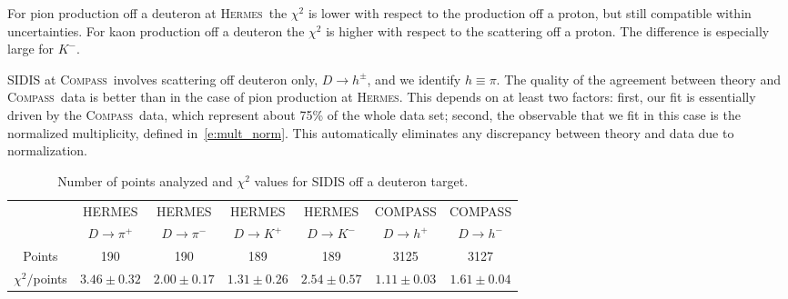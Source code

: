 \documentclass[aps,preprintnumbers,showpacs,nofootinbib,superscriptaddress,floatfix]{revtex4}
\newcommand{\hermes}{\textsc{Hermes}}
\newcommand{\compass}{\textsc{Compass}}
\begin{document}
For pion production off a deuteron at \hermes\ the $\chi^2$ is lower with
respect to the production off a proton, but still compatible within
uncertainties. For kaon production off a deuteron the $\chi^2$ is higher with
respect to the scattering off a proton. The difference is especially large for $K^-$. 

SIDIS at \compass\ involves scattering off deuteron only, $D \to h^\pm$, and we identify $h \equiv \pi$. 
The quality of the agreement between theory and \compass\ data is better than
in the case of pion production at \hermes. This depends on at least two
factors: first, our fit is essentially driven by the \compass\ data, which
represent about 75\% of the whole data set; second, the
observable that we fit in this case is the normalized
multiplicity, defined in~\eqref{e:mult_norm}. This automatically eliminates
any discrepancy between theory and data due to normalization. 
\begin{table}[h!]
\begin{center}
\begin{tabular}{|c|c|c|c|c|c|c|}
 \hline
\hline
  & HERMES & HERMES & HERMES & HERMES & COMPASS & COMPASS\\
 ~          &  $D \to \pi^+$    &   $D \to \pi^-$    &  $D \to K^+$    &   $D \to K^-$      &  $D \to h^+$    &   $D \to h^-$            \\
\hline
 Points         &  190 & 190 & 189 & 189   & 3125 & 3127   \\
 \hline
$\chi^2 /$points & $3.46\pm 0.32$ & $2.00\pm 0.17$ & $1.31\pm 0.26$ & $2.54\pm 0.57$  & $1.11\pm 0.03$ & $1.61\pm 0.04$ \\            
 \hline
 \hline
\end{tabular}
\caption{Number of points analyzed and $\chi^2$ values for SIDIS off a deuteron target.} 
\label{t:fl_ind_chi2_eD}
\end{center}
\end{table}


\end{document}
